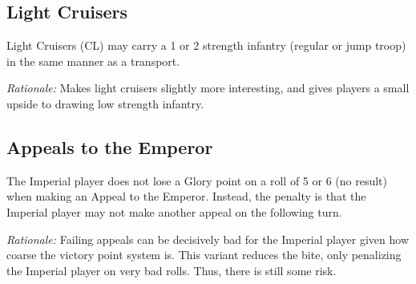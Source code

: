 \subsection{Light Cruisers}

Light Cruisers (CL) may carry a 1 or 2 strength infantry (regular or jump troop) in the same manner as a transport.

\textit{Rationale:} Makes light cruisers slightly more interesting, and gives players a small upside to drawing low strength infantry.

\subsection{Appeals to the Emperor}

The Imperial player does not lose a Glory point on a roll of 5 or 6 (no result) when making an Appeal to the Emperor. Instead, the penalty is that the Imperial player may not make another appeal on the following turn.

\textit{Rationale:} Failing appeals can be decisively bad for the Imperial player given how coarse the victory point system is. This variant reduces the bite, only penalizing the Imperial player on very bad rolls. Thus, there is still some risk.